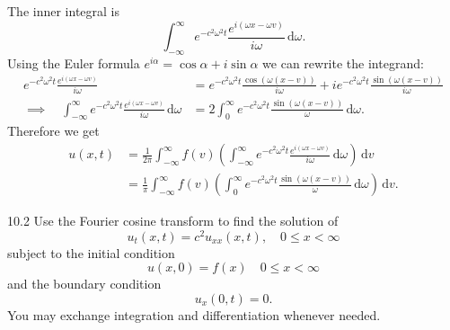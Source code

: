 \begin{derivation}
  The inner integral is
  \begin{equation*}
    \int_{-\infty}^{\infty} e^{-c^2 \omega^2t} \frac{e^{i \left( \omega x - \omega v \right)}}{i \omega} \, \mathrm{d}\omega
  .\end{equation*}
  Using the Euler formula $e^{i \alpha} = \cos \alpha + i \sin \alpha$ we can rewrite the integrand:
  \begin{align*}
    e^{-c^2 \omega^2 t} \frac{e^{i \left( \omega x - \omega v \right)}}{i \omega} &= e^{-c^2\omega^2 t} \frac{\cos \left( \omega(x - v) \right)}{i \omega} + i e^{-c^2 \omega^2 t} \frac{\sin \left( \omega \left( x - v \right) \right)}{i \omega} \\
  \implies \quad \int_{-\infty}^{\infty} e^{-c^2 \omega^2 t} \frac{e^{i \left( \omega x - \omega v \right)}}{i\omega} \, \mathrm{d}\omega &= 2 \int_{0}^{\infty} e^{-c^2 \omega^2 t} \frac{\sin \left( \omega \left( x - v \right) \right)}{\omega} \, \mathrm{d}\omega
  .\end{align*}
  Therefore we get
  \begin{align*}
    u(x,t) &= \frac{1}{2\pi} \int_{-\infty}^{\infty} f(v) \left( \int_{-\infty}^{\infty} e^{-c^2 \omega^2 t} \frac{e^{i \left( \omega x - \omega v \right)}}{i\omega} \, \mathrm{d}\omega \right) \, \mathrm{d}v \\
           &= \frac{1}{\pi} \int_{-\infty}^{\infty} f(v) \left( \int_{0}^{\infty} e^{-c^2 \omega^2 t} \frac{\sin \left( \omega \left( x - v \right) \right)}{\omega} \, \mathrm{d}\omega \right) \, \mathrm{d}v
  .\end{align*}
\end{derivation}


\begin{problem}{10.2}
  Use the Fourier cosine transform to find the solution of
  \begin{equation*}
    u_t(x,t) = c^2 u_{x x}(x,t), \quad 0 \leq x < \infty
  \end{equation*}
  subject to the initial condition
  \begin{equation*}
    u(x,0) = f(x) \quad 0 \leq x < \infty
  \end{equation*}
  and the boundary condition
  \begin{equation*}
    u_x(0,t) = 0
  .\end{equation*}
  You may exchange integration and differentiation whenever needed.
\end{problem}

